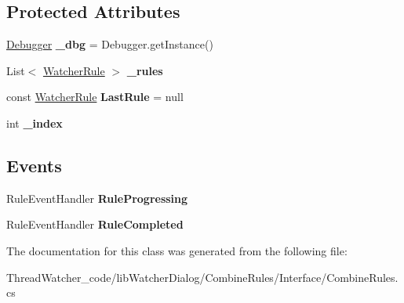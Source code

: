 \subsection*{Protected Attributes}
\begin{DoxyCompactItemize}
\item 
\hypertarget{classlib_watcher_dialog_1_1_combine_rules_1_1_combine_rules_a99da7c7f3f55fcef808054f776f840f6}{\hyperlink{class_watcher_1_1_debugger_1_1_debugger}{Debugger} {\bfseries \+\_\+dbg} = Debugger.\+get\+Instance()}\label{classlib_watcher_dialog_1_1_combine_rules_1_1_combine_rules_a99da7c7f3f55fcef808054f776f840f6}

\item 
\hypertarget{classlib_watcher_dialog_1_1_combine_rules_1_1_combine_rules_a624816a00c80e8302b9c316175866fb6}{List$<$ \hyperlink{class_watcher_1_1_debugger_1_1_watcher_rule}{Watcher\+Rule} $>$ {\bfseries \+\_\+rules}}\label{classlib_watcher_dialog_1_1_combine_rules_1_1_combine_rules_a624816a00c80e8302b9c316175866fb6}

\item 
\hypertarget{classlib_watcher_dialog_1_1_combine_rules_1_1_combine_rules_a7c5a030a0dda9e4c6523e07f879d469d}{const \hyperlink{class_watcher_1_1_debugger_1_1_watcher_rule}{Watcher\+Rule} {\bfseries Last\+Rule} = null}\label{classlib_watcher_dialog_1_1_combine_rules_1_1_combine_rules_a7c5a030a0dda9e4c6523e07f879d469d}

\item 
\hypertarget{classlib_watcher_dialog_1_1_combine_rules_1_1_combine_rules_ac8d90d5f58da22108eed8518a4a3a950}{int {\bfseries \+\_\+index}}\label{classlib_watcher_dialog_1_1_combine_rules_1_1_combine_rules_ac8d90d5f58da22108eed8518a4a3a950}

\end{DoxyCompactItemize}
\subsection*{Events}
\begin{DoxyCompactItemize}
\item 
\hypertarget{classlib_watcher_dialog_1_1_combine_rules_1_1_combine_rules_a44541f2a969fb93f82db5f2fa908cf12}{Rule\+Event\+Handler {\bfseries Rule\+Progressing}}\label{classlib_watcher_dialog_1_1_combine_rules_1_1_combine_rules_a44541f2a969fb93f82db5f2fa908cf12}

\item 
\hypertarget{classlib_watcher_dialog_1_1_combine_rules_1_1_combine_rules_a793031b05327547d8d14c6abd06ce632}{Rule\+Event\+Handler {\bfseries Rule\+Completed}}\label{classlib_watcher_dialog_1_1_combine_rules_1_1_combine_rules_a793031b05327547d8d14c6abd06ce632}

\end{DoxyCompactItemize}


The documentation for this class was generated from the following file\+:\begin{DoxyCompactItemize}
\item 
Thread\+Watcher\+\_\+code/lib\+Watcher\+Dialog/\+Combine\+Rules/\+Interface/Combine\+Rules.\+cs\end{DoxyCompactItemize}
